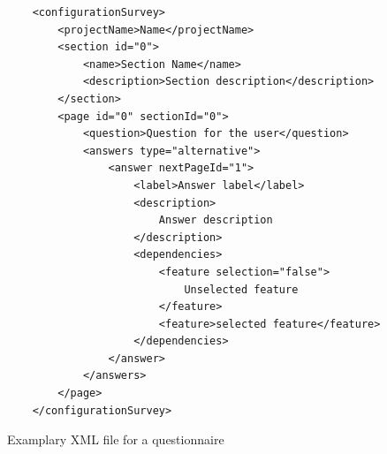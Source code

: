 \begin{figure}[H]
	\lstset{language=XML}
	\begin{lstlisting}
	<configurationSurvey>
		<projectName>Name</projectName>
		<section id="0">
			<name>Section Name</name>
			<description>Section description</description>
		</section>
		<page id="0" sectionId="0">
			<question>Question for the user</question>
			<answers type="alternative">
				<answer nextPageId="1">
					<label>Answer label</label>
					<description>
						Answer description
					</description>
					<dependencies>
						<feature selection="false">
							Unselected feature
						</feature>
						<feature>selected feature</feature>
					</dependencies>
				</answer>
			</answers>
		</page>
	</configurationSurvey>
	\end{lstlisting}
	\caption{Examplary XML file for a  questionnaire}
	\label{fig:xmlFigure}
\end{figure}

